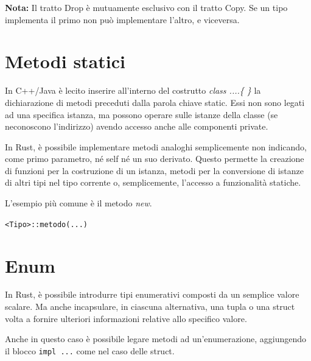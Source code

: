 \noindent
\begin{tcolorbox}
  \textbf{Nota:} Il tratto Drop è mutuamente esclusivo con il tratto Copy.
  Se un tipo implementa il primo non può implementare l'altro, e viceversa.
\end{tcolorbox}



\section{Metodi statici}

In C++/Java è lecito inserire all'interno del costrutto \textit{class ....\{ \}} la dichiarazione
di metodi preceduti dalla parola chiave static. Essi non sono legati ad una specifica istanza,
ma possono operare sulle istanze della classe (se neconoscono l'indirizzo)
avendo accesso anche alle componenti private.


In Rust, è possibile implementare metodi analoghi semplicemente non indicando,
come primo parametro, né self né un suo derivato. Questo permette la creazione
di funzioni per la costruzione di un istanza, metodi per la conversione di
istanze di altri tipi nel tipo corrente o, semplicemente, l'accesso a
funzionalità statiche.

L'esempio più comune è il metodo \textit{new}.

\begin{center}
  \centering
  \texttt{<Tipo>::metodo(...)}
\end{center}


\section{Enum}


In Rust, è possibile introdurre tipi enumerativi composti da un semplice valore
scalare. Ma anche incapsulare, in ciascuna alternativa, una tupla o una struct volta a fornire ulteriori
informazioni relative allo specifico valore.

Anche in questo caso è possibile legare metodi ad un'enumerazione, aggiungendo il blocco \texttt{impl ...}
come nel caso delle struct.


